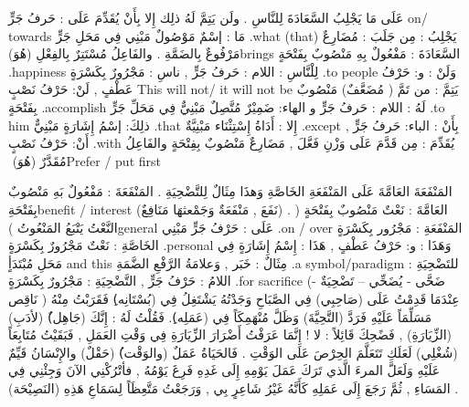 \documentclass[a4paper]{article}
\begin{document}
\begin{flushright}
عَلَى مَا يَجْلِبُ السَّعَادَةَ لِلنَّاسِ . ولَن يَتِمَّ لَهُ ذلِك إِلا بِأَنْ يُقَدِّمَ
عَلَى : حَرفُ جَرٍّ on/ towards
مَا : إسْمٌ مَوْصُولٌ مَبْنِي فِي مَحَلِ جَرٍّ .what (that)
يَجْلِبُ : مِن جَلَبَ : مُضَارِعٌ مَرْفُوعٌ بِالضَمَّةِ . والفَاعِلُ مُسْتَتِرٌ بِالفِعْلِ (هُوَ)brings
السَّعَادَةَ : مَفْعُولٌ بِهِ مَنْصُوبٌ بِفَتْحَةٍ .happiness
لِلْنَّاسِ : اللام : حَرفُ جَرٍّ ,  ناسِ : مَجْرُورٌ بِكَسْرَةٍ .to people
وَلَنْ : و: حَرْفُ عَطْفٍ ,  لَنْ: حَرْفُ نَصْبٍ This will not/ it will not be
يَتِمَّ : من تَمَّ ( مُضَعَّفٌ) مَنْصُوبٌ بِفَتْحَةٍ .accomplish
لَهُ : اللام : حَرفُ جَرٍّ  و الهاء: ضَمِيْرٌ مُتَّصِلٌ مَبْنِيٌّ فِي مَحَلِّ جَرٍّ .to him
ذلِكَ: إسْمُ إِشَارَةٍ مَبْنِيٌّ .that
إِلا : أَدَاةُ إِسْتِثْنَاء مَبْنِيَّةٌ .except
بِأَنْ : الباء: حَرفُ جَرٍّ ,  أَنْ: حَرْفُ نَصْبٍ .with
يُقَدِّمَ : مِن قَدَّمَ عَلَى وَزْنِ فَعَّلَ , مَضَارِعٌ مَنْصُوبٌ بِفِتْحَةٍ والفَاعِلُ مُقَدَّرٌ (هُوَ)
‏Prefer / put first
 

المَنْفَعَةَ العَامَّةَ عَلَى المَنْفَعَةِ الخَاصَّةِ وَهذَا مِثَالٌ لِلتَّضْحِيَةِ .
 المَنْفَعَةَ : مَفْعُولٌ بَهِ مَنْصُوبٌ بِفَتْحَةِbenefit / interest
            (نَفَعَ , مَنْفَعَةٌ وَجَمْعثهَا مَنَافِعٌ) .
العَامَّةَ : نَعْتٌ مَنْصُوبٌ بِفَتْحَةٍ ( النَّعْتُ يَتْبَعُ المَنْعُوتُ )general
عَلَى : حَرْفُ جَرٍّ مَبْنِي .on / over
المَنْفَعَةِ : مَجْرُور بِكَسْرَةٍ
الخَاصَّةِ : نَعْتٌ مَجْرُورٌ بِكَسْرَةٍ .personal
وَهَذَا : و: حَرْفُ عَطْفٍ , هَذَا : إِسْمُ إِشَارَةٍ فِي مَحَلِ مُبْتَدَأٍ and this
مِثَالٌ : خَبَر , وَعلامَةُ الرَّفْعِ الضَّمَةِ .a symbol/paradigm
للتَضْحِيَةِ : اللامُ : حَرْفُ جَرٍّ , التَّضْحِيَةِ : مَجْرُورٌ بِكَسْرَةٍ .for sacrifice
(ضَحَّى - يُضَحِّي – تَضْحِيَةٌ - نَاقِص )
عِنْدَمَا قَدِمْتُ عَلَى (صَاحِبِي) فِي الصَّبَاحِ وَجَدْتُهُ يَشْتَغِلُ فِي
(بُسْتَانِه)ِ فَقَرَبْتُ مِنْهُ مَسَلِّمَاً عَلَيْهِ فَرَدَّ (التَّحِيَّةَ) وَظَلَّ مُنْهَمِكَاً فِي
(عَمَلِه)ِ. فَقُلْتُ لَهُ : إِنَّكَ (جَاهِل)ٌ (لأدَبِ) (الزِّيَارَةِ) , فَضًحِكَ
قَائِلاً : لا ! إِنَّمَا عَرَفْتُ أَضْرَارَ الزِّيَارَةِ فِي وَقْتِ العَمَلِ ,
فَبَقَيْتُ مُتَابِعَاً (شُغْلِي) لَعَلَكِ تَتَعَلَّمَ الحِرْصَ عَلَى الوَقْتِ . فَالحَيَاةُ
عَمَلٌ (والوَقْت)ُ (حَقْلٌ) والإِنْسَانُ قَيِّمٌ عَلَيْهِ وَلَعَلَّ المرءَ الَّذي
تَرَكَ عَمَلَ يَوْمِهِ إِلَى غَدِهِ فَرِغَ يَوْمُهُ , فأتْرُكْنِي الآنَ وَجِئْنِي فِي
المَسَاءِ , ثُمَّ رَجَعَ إِلَى عَمَلِهِ كَأَنَّهُ غَيْرُ شَاعِرٍ بِي , وَرَجَعْتُ
مَتَّعِظَاً لِسَمَاعِ هَذِهِ (النَصِيْحَة) .
 

\end{flushright}
\end{document}
